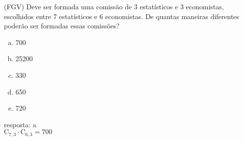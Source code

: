\begin{ex}
 	(FGV) Deve ser formada uma comissão de 3 estatísticos e 3 economistas, escolhidos entre 7 estatísticos e 6 economistas. De quantas maneiras diferentes poderão ser formadas essas comissões?
    \begin{enumerate}[(a)]
    \item 700
    \item 25200
    \item 330
    \item 650
    \item 720
    \end{enumerate}
      \begin{sol}
       resposta: a \\ 
       $\mathrm{C}_{7,3}\cdot\mathrm{C}_{6,3}=700$
      \end{sol}
      
\end{ex}